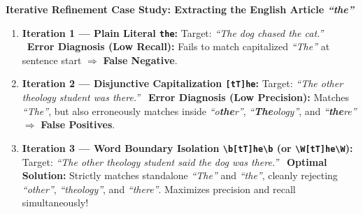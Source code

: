 \documentclass[10pt,a4paper]{article}
\newcommand{\rx}[1]{\texttt{\bfseries\color{inlinecode}#1}}
\newcommand{\cmark}{\textcolor{accentgreen}{\textbf{\checkmark}}}
\newcommand{\xmark}{\textcolor{accentred}{\textbf{\texttimes}}}
\begin{document}
\vspace{-1pt}
\begin{examplebox}
\footnotesize
\textbf{Iterative Refinement Case Study: Extracting the English Article \textit{``the''}}
\begin{enumerate}[leftmargin=14pt, itemsep=2.5pt, parsep=0pt, topsep=1pt]
    \item \textbf{Iteration 1 --- Plain Literal \rx{the}:}
    \newline Target: \textit{``The dog chased the cat.''}
    \newline \xmark\ \textbf{Error Diagnosis (Low Recall):} Fails to match capitalized \textit{``The''} at sentence start $\Longrightarrow$ \textbf{False Negative}.
    \item \textbf{Iteration 2 --- Disjunctive Capitalization \rx{[tT]he}:}
    \newline Target: \textit{``The other theology student was there.''}
    \newline \xmark\ \textbf{Error Diagnosis (Low Precision):} Matches \textit{``The''}, but also erroneously matches inside \textit{``o\textbf{the}r''}, \textit{``\textbf{The}ology''}, and \textit{``\textbf{the}re''} $\Longrightarrow$ \textbf{False Positives}.
    \item \textbf{Iteration 3 --- Word Boundary Isolation \rx{\textbackslash b[tT]he\textbackslash b} (or \rx{\textbackslash W[tT]he\textbackslash W}):}
    \newline Target: \textit{``The other theology student said the dog was there.''}
    \newline \cmark\ \textbf{Optimal Solution:} Strictly matches standalone \textit{``The''} and \textit{``the''}, cleanly rejecting \textit{``other''}, \textit{``theology''}, and \textit{``there''}. Maximizes precision and recall simultaneously!
\end{enumerate}
\end{examplebox}

\vspace{3pt}
\par\vspace{1pt}
\end{document}
